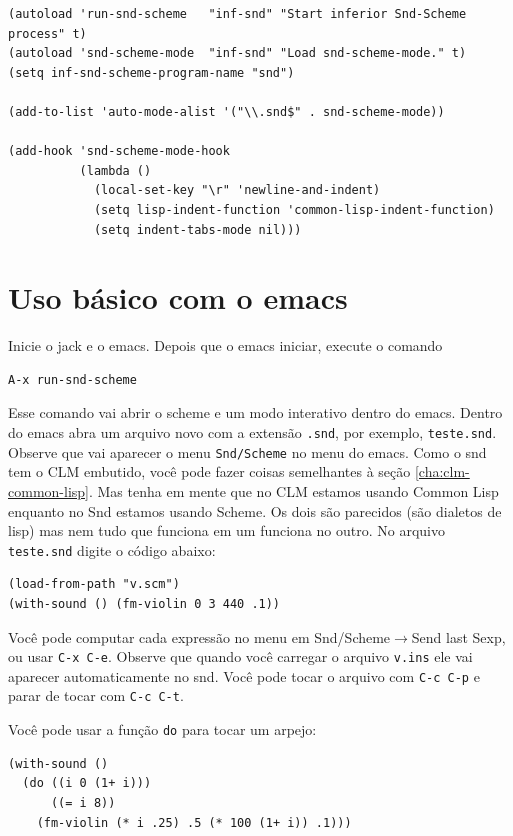 \documentclass[12pt,brazil]{book}
\newcommand{\sep}{$\rightarrow$}
\begin{document}
\begin{verbatim}
(autoload 'run-snd-scheme   "inf-snd" "Start inferior Snd-Scheme process" t)
(autoload 'snd-scheme-mode  "inf-snd" "Load snd-scheme-mode." t)
(setq inf-snd-scheme-program-name "snd")

(add-to-list 'auto-mode-alist '("\\.snd$" . snd-scheme-mode))

(add-hook 'snd-scheme-mode-hook
          (lambda ()
            (local-set-key "\r" 'newline-and-indent)
            (setq lisp-indent-function 'common-lisp-indent-function)
            (setq indent-tabs-mode nil)))
\end{verbatim}

\section{Uso básico com o emacs}
\label{sec:uso-basico-3}

Inicie o jack e o emacs. Depois que o emacs iniciar, execute o comando

\begin{verbatim}
A-x run-snd-scheme
\end{verbatim}

Esse comando vai abrir o scheme e um modo interativo dentro do emacs.
Dentro do emacs abra um arquivo novo com a extensão \texttt{.snd}, por
exemplo, \texttt{teste.snd}. Observe que vai aparecer o menu
\texttt{Snd/Scheme} no menu do emacs. Como o snd tem o CLM embutido,
você pode fazer coisas semelhantes à seção \ref{cha:clm-common-lisp}.
Mas tenha em mente que no CLM estamos usando Common Lisp enquanto no
Snd estamos usando Scheme. Os dois são parecidos (são dialetos de
lisp) mas nem tudo que funciona em um funciona no outro. No arquivo
\texttt{teste.snd} digite o código abaixo:

\begin{verbatim}
(load-from-path "v.scm")
(with-sound () (fm-violin 0 3 440 .1))
\end{verbatim}

Você pode computar cada expressão no menu em Snd/Scheme\sep Send last
Sexp, ou usar \texttt{C-x C-e}. Observe que quando você carregar o
arquivo \texttt{v.ins} ele vai aparecer automaticamente no snd. Você
pode tocar o arquivo com \texttt{C-c C-p} e parar de tocar com
\texttt{C-c C-t}.

Você pode usar a função \texttt{do} para tocar um arpejo:

\begin{verbatim}
(with-sound ()
  (do ((i 0 (1+ i)))
      ((= i 8))
    (fm-violin (* i .25) .5 (* 100 (1+ i)) .1)))
\end{verbatim}
\end{document}
